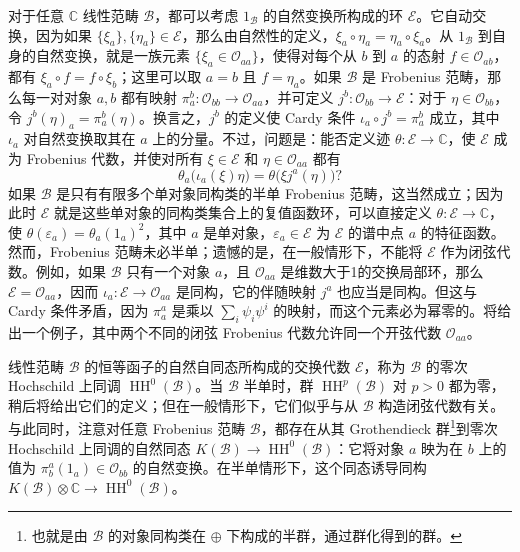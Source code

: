 对于任意 $\mathbb{C}$ 线性范畴 $\mathcal{B}$，都可以考虑 $1_{\mathcal{B}}$ 的自然变换所构成的环 $\mathcal{E}$。它自动交换，因为如果 $\{\xi_a\},\{\eta_a\}\in\mathcal{E}$，那么由自然性的定义，$\xi_a\circ\eta_a=\eta_a\circ\xi_a$。从 $1_{\mathcal{B}}$ 到自身的自然变换，就是一族元素 $\{\xi_a\in\mathcal{O}_{aa}\}$，使得对每个从 $b$ 到 $a$ 的态射 $f\in\mathcal{O}_{ab}$，都有 $\xi_a\circ f=f\circ\xi_b$；这里可以取 $a=b$ 且 $f=\eta_a$。如果 $\mathcal{B}$ 是 Frobenius 范畴，那么每一对对象 $a,b$ 都有映射 $\pi_a^b\colon\mathcal{O}_{bb}\to\mathcal{O}_{aa}$，并可定义 $j^b\colon\mathcal{O}_{bb}\to\mathcal{E}$：对于 $\eta\in\mathcal{O}_{bb}$，令 $j^b(\eta)_a=\pi_a^b(\eta)$。换言之，$j^b$ 的定义使 Cardy 条件 $\iota_a\circ j^b=\pi_a^b$ 成立，其中 $\iota_a$ 对自然变换取其在 $a$ 上的分量。不过，问题是：能否定义迹 $\theta\colon\mathcal{E}\to\mathbb{C}$，使 $\mathcal{E}$ 成为 Frobenius 代数，并使对所有 $\xi\in\mathcal{E}$ 和 $\eta\in\mathcal{O}_{aa}$ 都有
\begin{equation}\label{eq:2.43}
\theta_a\bigl(\iota_a(\xi)\eta\bigr)=\theta\bigl(\xi j^a(\eta)\bigr)?
\end{equation}
如果 $\mathcal{B}$ 是只有有限多个单对象同构类的半单 Frobenius 范畴，这当然成立；因为此时 $\mathcal{E}$ 就是这些单对象的同构类集合上的复值函数环，可以直接定义 $\theta\colon\mathcal{E}\to\mathbb{C}$，使 $\theta(\varepsilon_a)=\theta_a(1_a)^2$，其中 $a$ 是单对象，$\varepsilon_a\in\mathcal{E}$ 为 $\mathcal{E}$ 的谱中点 $a$ 的特征函数。然而，Frobenius 范畴未必半单；遗憾的是，在一般情形下，不能将 $\mathcal{E}$ 作为闭弦代数。例如，如果 $\mathcal{B}$ 只有一个对象 $a$，且 $\mathcal{O}_{aa}$ 是维数大于1的交换局部环，那么 $\mathcal{E}=\mathcal{O}_{aa}$，因而 $\iota_a\colon\mathcal{E}\to\mathcal{O}_{aa}$ 是同构，它的伴随映射 $j^a$ 也应当是同构。但这与 Cardy 条件矛盾，因为 $\pi_a^a$ 是乘以 $\sum_i\psi_i\psi^i$ 的映射，而这个元素必为幂零的。将给出一个例子，其中两个不同的闭弦 Frobenius 代数允许同一个开弦代数 $\mathcal{O}_{aa}$。

线性范畴 $\mathcal{B}$ 的恒等函子的自然自同态所构成的交换代数 $\mathcal{E}$，称为 $\mathcal{B}$ 的零次 Hochschild 上同调 $\operatorname{HH}^0(\mathcal{B})$。当 $\mathcal{B}$ 半单时，群 $\operatorname{HH}^p(\mathcal{B})$ 对 $p>0$ 都为零，稍后将给出它们的定义；但在一般情形下，它们似乎与从 $\mathcal{B}$ 构造闭弦代数有关。与此同时，注意对任意 Frobenius 范畴 $\mathcal{B}$，都存在从其 Grothendieck 群\footnote{也就是由 $\mathcal{B}$ 的对象同构类在 $\oplus$ 下构成的半群，通过群化得到的群。}到零次 Hochschild 上同调的自然同态 $K(\mathcal{B})\to\operatorname{HH}^0(\mathcal{B})$：它将对象 $a$ 映为在 $b$ 上的值为 $\pi_b^a(1_a)\in\mathcal{O}_{bb}$ 的自然变换。在半单情形下，这个同态诱导同构 $K(\mathcal{B})\otimes\mathbb{C}\to\operatorname{HH}^0(\mathcal{B})$。

